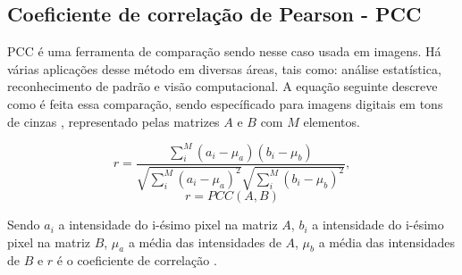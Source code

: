 \begin{comment}

\subsection{THE PEARSON CORRELATION COEFFICIENT}

$PCC$ is used in statistical analyses, pattern recognition and computer vision. 
It can be used to comparing two images in an object recognition system. 
The following equation describes the $PCC$ method for two gray scale digital images\cite{Eugene},
represented by the matrices $A$ and $B$ with $M$ elements each one,
\begin{equation}
r = \frac{\sum \limits_{i}^{M} (a_i-\mu_a)(b_i-\mu_b)}{\sqrt{\sum \limits_{i}^{M} (a_i-\mu_a)^2} \sqrt{\sum\limits_{i}^{M} (b_i-\mu_b)^2}},
\end{equation}
\begin{equation}\label{eq:PCC}
 r=PCC(A,B)
\end{equation}

where $a_i$ is the intensity of the i-th pixel in the  matrix $A$, 
$b_i$ is the intensity of the i-th pixel in the matrix $B$, 
$\mu_a$ is the mean intensity of $A$,
$\mu_b$ is the mean intensity of $B$ and
$r$ is the correlation coefficient \cite{Miranda Neto}.

\end{comment}



\subsection{Coeficiente de correlação de Pearson - PCC}

PCC é uma ferramenta de comparação sendo nesse caso usada em imagens. Há várias aplicações desse método 
em diversas áreas, tais como: análise estatística, reconhecimento de padrão e visão computacional. 
A equação seguinte descreve como é feita essa comparação, sendo específicado para imagens digitais 
em tons de cinzas \cite{Eugene}, representado pelas matrizes $A$ e $B$ com $M$ elementos.

\begin{equation}
r = \frac{\sum \limits_{i}^{M} (a_i-\mu_a)(b_i-\mu_b)}{\sqrt{\sum \limits_{i}^{M} (a_i-\mu_a)^2} \sqrt{\sum\limits_{i}^{M} (b_i-\mu_b)^2}},
\end{equation}
\begin{equation}\label{eq:PCC}
 r=PCC(A,B)
\end{equation}

Sendo $a_i$ a intensidade do i-ésimo pixel na matriz $A$, $b_i$ a intensidade do i-ésimo pixel na matriz
$B$, $\mu_a$ a média das intensidades de $A$, $\mu_b$ a média das intensidades de $B$ e $r$ é o coeficiente
de correlação \cite{Miranda Neto}.
